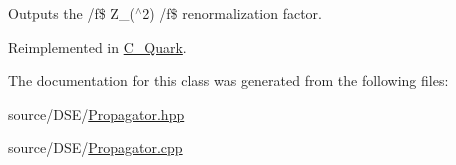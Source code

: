 Outputs the /f\$ Z\-\_($^\wedge$2) /f\$ renormalization factor. 



Reimplemented in \hyperlink{class_c___quark_a71b08f07b27da3df956536858238ec14}{C\-\_\-\-Quark}.



The documentation for this class was generated from the following files\-:\begin{DoxyCompactItemize}
\item 
source/\-D\-S\-E/\hyperlink{_propagator_8hpp}{Propagator.\-hpp}\item 
source/\-D\-S\-E/\hyperlink{_propagator_8cpp}{Propagator.\-cpp}\end{DoxyCompactItemize}
